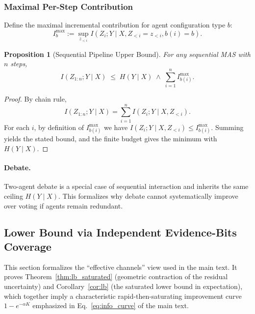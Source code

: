 \documentclass{article}
\theoremstyle{plain}
\newtheorem{proposition}[theorem]{Proposition}
\theoremstyle{definition}
\theoremstyle{remark}
\begin{document}
\subsubsection{Maximal Per-Step Contribution}
\label{app:imax}

Define the maximal incremental contribution for agent configuration type $b$:
\begin{equation}
I_b^{\max}
:=
\sup_{z_{<i}}
I(Z_i;Y\mid X,Z_{<i}=z_{<i}, b(i)=b).
\label{eq:imax}
\end{equation}

\begin{proposition}[Sequential Pipeline Upper Bound]
\label{prop:sequential}
For any sequential MAS with $n$ steps,
\begin{equation}
I(Z_{1:n};Y\mid X)
\;\le\;
H(Y\mid X) \;\wedge\; \sum_{i=1}^n I_{b(i)}^{\max}.
\label{eq:sequential-bound}
\end{equation}
\end{proposition}

\begin{proof}
By chain rule,
\begin{equation}
I(Z_{1:n};Y\mid X)=\sum_{i=1}^n I(Z_i;Y\mid X,Z_{<i}).
\end{equation}
For each $i$, by definition of $I_{b(i)}^{\max}$ we have
$I(Z_i;Y\mid X,Z_{<i})\le I_{b(i)}^{\max}$.
Summing yields the stated bound, and the finite budget gives the minimum with $H(Y\mid X)$.
\end{proof}

\paragraph{Debate.}
Two-agent debate is a special case of sequential interaction and inherits the same ceiling $H(Y\mid X)$.
This formalizes why debate cannot systematically improve over voting if agents remain redundant.

\subsection{Lower Bound via Independent Evidence-Bits Coverage}
\label{app:lowerbound}

This section formalizes the ``effective channels'' view used in the main text.
It proves Theorem~\ref{thm:lb_saturated} (geometric contraction of the residual uncertainty)
and Corollary~\ref{cor:lb} (the saturated lower bound in expectation), which together imply a characteristic rapid-then-saturating improvement curve $1-e^{-\alpha K}$ emphasized in Eq.~\eqref{eq:info_curve} of the main text.
\end{document}
